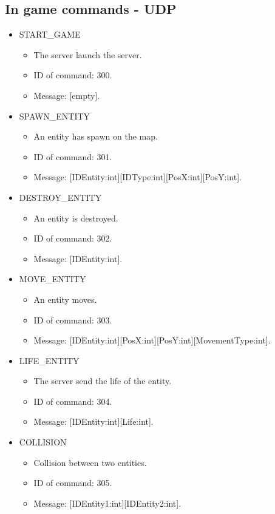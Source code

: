 \documentclass[a4 paper, 12pt]{report}
\begin{document}
\subsection{In game commands - UDP}
\begin{itemize}
\item START\_GAME
  \begin{itemize}
  \item The server launch the server.
  \item ID of command: 300.
  \item Message: [empty].
  \end{itemize}

\item SPAWN\_ENTITY
  \begin{itemize}
  \item An entity has spawn on the map.
  \item ID of command: 301.
  \item Message: [IDEntity:int][IDType:int][PosX:int][PosY:int].
  \end{itemize}

\item DESTROY\_ENTITY
  \begin{itemize}
  \item An entity is destroyed.
  \item ID of command: 302.
  \item Message: [IDEntity:int].
  \end{itemize}

\item MOVE\_ENTITY
  \begin{itemize}
  \item An entity moves.
  \item ID of command: 303.
  \item Message: [IDEntity:int][PosX:int][PosY:int][MovementType:int].
  \end{itemize}

\item LIFE\_ENTITY
  \begin{itemize}
  \item The server send the life of the entity.
  \item ID of command: 304.
  \item Message: [IDEntity:int][Life:int].
  \end{itemize}

\item COLLISION
  \begin{itemize}
  \item Collision between two entities.
  \item ID of command: 305.
  \item Message: [IDEntity1:int][IDEntity2:int].
  \end{itemize}


\end{itemize}
\end{document}
